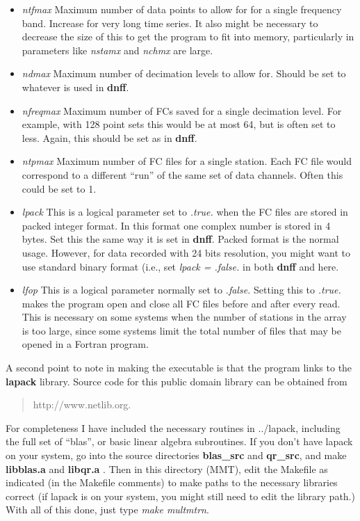 \begin{itemize}

\item {\it ntfmax} Maximum number of data points to allow for for a single
frequency band.  Increase for very long time series. It also might be
necessary to decrease the size of this to get the program to fit into 
memory, particularly in parameters like {\it nstamx} and {\it nchmx}
are large.

\item {\it ndmax} Maximum number of decimation levels to allow for.  Should be
set to whatever is used in {\bf dnff}.

\item {\it nfreqmax} Maximum number of FCs saved for a single decimation
level.  For example, with 128 point sets this would be at most 64,
but is often set to less.  Again, this should be set as in {\bf dnff}.

\item {\it ntpmax}  Maximum number of FC files for a single station.  Each
FC file would correspond to a different ``run'' of the same set of
data channels.  Often this could be set to 1.

\item {\it lpack} This is a logical parameter
set to {\it .true.} when the FC files are
stored in packed integer format.  In this format one complex number
is stored in 4 bytes.  Set this the same way it is set in {\bf dnff}.
Packed format is the normal usage.  However, for data recorded with
24 bits resolution, you might want to use standard binary format
(i.e., set {\it lpack = .false.} in both {\bf dnff} and here.

\item {\it lfop }  This is a logical parameter normally set to {\it .false.}
Setting this to {\it .true.} makes the program open and close all
FC files before and after every read.  This is necessary on some systems
when the number of stations in the array is too large, since some systems
limit the total number of files that may be opened in a Fortran program.

\end{itemize}

A second point to note in making the executable is that
the program links to the {\bf lapack} library.  Source code for this
public domain library can be obtained from
\begin{quote}
 http://www.netlib.org.
\end{quote}
For completeness I have included the necessary
routines in ../lapack, including the full set of ``blas'',
or basic linear algebra subroutines.  
If you don't have lapack on your system,
go into the source directories {\bf blas\_src} and {\bf qr\_src}, and make
{\bf libblas.a} 
and {\bf libqr.a} .  Then in this directory (MMT), edit the 
Makefile as indicated (in 
the Makefile comments) to make paths to the necessary libraries correct
(if lapack is on your system, you might still need to edit the library path.)
With all of this done, just type {\it make multmtrn}.

